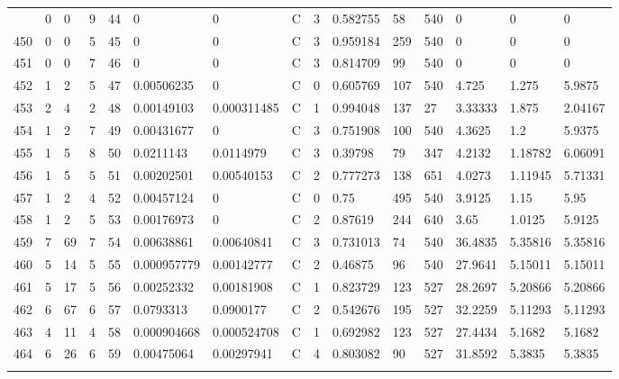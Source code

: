 \begin{latin}
\begin{longtable}{lllllllllllllll}
\begin{comment}
	449 & 0  & 0   & 9  & 44  & 0              & 0              & C & 3  & 0.582755 & 58   & 540  & 0       & 0       & 0       \\
	450 & 0  & 0   & 5  & 45  & 0              & 0              & C & 3  & 0.959184 & 259  & 540  & 0       & 0       & 0       \\
	451 & 0  & 0   & 7  & 46  & 0              & 0              & C & 3  & 0.814709 & 99   & 540  & 0       & 0       & 0       \\
	452 & 1  & 2   & 5  & 47  & 0.00506235     & 0              & C & 0  & 0.605769 & 107  & 540  & 4.725   & 1.275   & 5.9875  \\
	453 & 2  & 4   & 2  & 48  & 0.00149103     & 0.000311485    & C & 1  & 0.994048 & 137  & 27   & 3.33333 & 1.875   & 2.04167 \\
	454 & 1  & 2   & 7  & 49  & 0.00431677     & 0              & C & 3  & 0.751908 & 100  & 540  & 4.3625  & 1.2     & 5.9375  \\
	455 & 1  & 5   & 8  & 50  & 0.0211143      & 0.0114979      & C & 3  & 0.39798  & 79   & 347  & 4.2132  & 1.18782 & 6.06091 \\
	456 & 1  & 5   & 5  & 51  & 0.00202501     & 0.00540153     & C & 2  & 0.777273 & 138  & 651  & 4.0273  & 1.11945 & 5.71331 \\
	457 & 1  & 2   & 4  & 52  & 0.00457124     & 0              & C & 0  & 0.75     & 495  & 540  & 3.9125  & 1.15    & 5.95    \\
	458 & 1  & 2   & 5  & 53  & 0.00176973     & 0              & C & 2  & 0.87619  & 244  & 640  & 3.65    & 1.0125  & 5.9125  \\
	459 & 7  & 69  & 7  & 54  & 0.00638861     & 0.00640841     & C & 3  & 0.731013 & 74   & 540  & 36.4835 & 5.35816 & 5.35816 \\
	460 & 5  & 14  & 5  & 55  & 0.000957779    & 0.00142777     & C & 2  & 0.46875  & 96   & 540  & 27.9641 & 5.15011 & 5.15011 \\
	461 & 5  & 17  & 5  & 56  & 0.00252332     & 0.00181908     & C & 1  & 0.823729 & 123  & 527  & 28.2697 & 5.20866 & 5.20866 \\
	462 & 6  & 67  & 6  & 57  & 0.0793313      & 0.0900177      & C & 2  & 0.542676 & 195  & 527  & 32.2259 & 5.11293 & 5.11293 \\
	463 & 4  & 11  & 4  & 58  & 0.000904668    & 0.000524708    & C & 1  & 0.692982 & 123  & 527  & 27.4434 & 5.1682  & 5.1682  \\
	464 & 6  & 26  & 6  & 59  & 0.00475064     & 0.00297941     & C & 4  & 0.803082 & 90   & 527  & 31.8592 & 5.3835  & 5.3835  \\

\end{comment}
\end{longtable}
\end{latin}
